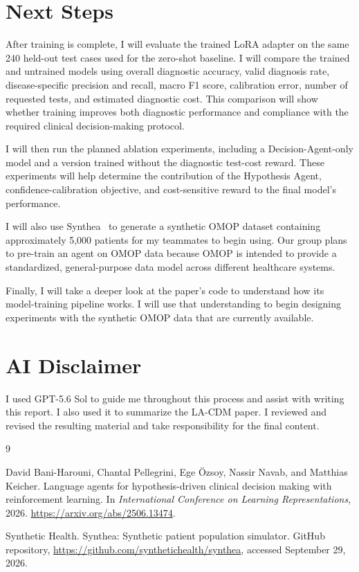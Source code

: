 \documentclass[11pt]{article}
\begin{document}
\section{Next Steps}

After training is complete, I will evaluate the trained LoRA adapter on the same 240 held-out test cases used for the
zero-shot baseline. I will compare the trained and untrained models using overall diagnostic accuracy, valid diagnosis
rate, disease-specific precision and recall, macro F1 score, calibration error, number of requested tests, and 
estimated diagnostic cost. This comparison will show whether training improves both diagnostic performance and
compliance with the required clinical decision-making protocol.

I will then run the planned ablation experiments, including a Decision-Agent-only model and a version trained without
the diagnostic test-cost reward. These experiments will help determine the contribution of the Hypothesis Agent,
confidence-calibration objective, and cost-sensitive reward to the final model's performance.

I will also use Synthea~\cite{syntheaGithub} to generate a synthetic OMOP dataset containing approximately 5,000
patients for my teammates to begin using. Our group plans to pre-train an agent on OMOP data because OMOP is intended
to provide a standardized, general-purpose data model across different healthcare systems.

Finally, I will take a deeper look at the paper's code to understand how its model-training pipeline works. I will use
that understanding to begin designing experiments with the synthetic OMOP data that are currently available.

\section{AI Disclaimer}

I used GPT-5.6 Sol to guide me throughout this process and assist with writing this report. I also used it to summarize
the LA-CDM paper. I reviewed and revised the resulting material and take responsibility for the final content.


\begin{thebibliography}{9}

David Bani-Harouni, Chantal Pellegrini, Ege {\"O}zsoy, Nassir Navab, and
Matthias Keicher.
\newblock Language agents for hypothesis-driven clinical decision making with
reinforcement learning.
\newblock In \emph{International Conference on Learning Representations}, 2026.
\newblock \url{https://arxiv.org/abs/2506.13474}.

Synthetic Health.
\newblock Synthea: Synthetic patient population simulator.
\newblock GitHub repository, \url{https://github.com/synthetichealth/synthea}, accessed September 29, 2026.

\end{thebibliography}
\end{document}
